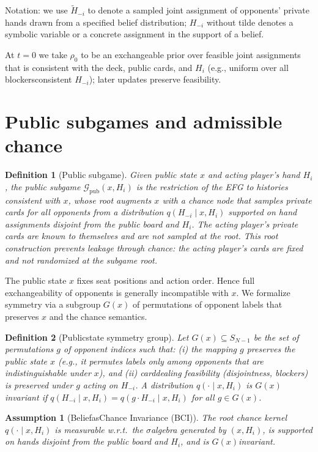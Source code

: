 \documentclass[10pt]{article}
\newcommand{\1}{\mathbf{1}}
\theoremstyle{plain}
\newtheorem{definition}{Definition}
\newtheorem{assumption}{Assumption}
\begin{document}
Notation: we use $\tilde H_{-i}$ to denote a sampled joint assignment of opponents' private hands drawn from a specified belief distribution; $H_{-i}$ without tilde denotes a symbolic variable or a concrete assignment in the support of a belief.

At $t=0$ we take $\rho_0$ to be an exchangeable prior over feasible joint assignments that is consistent with the deck, public cards, and $H_i$ (e.g., uniform over all blockers\textendash consistent $H_{-i}$); later updates preserve feasibility.

\section{Public subgames and admissible chance}
\label{sec:public_subgames}
\begin{definition}[Public subgame]
Given public state $x$ and acting player's hand $H_i$, the \emph{public subgame} $\mathcal{G}_{\text{pub}}(x,H_i)$ is the restriction of the EFG to histories consistent with $x$, whose root augments $x$ with a chance node that samples private cards for all \emph{opponents} from a distribution $q(H_{-i}\mid x,H_i)$ supported on hand assignments disjoint from the public board and $H_i$. The acting player’s private cards are known to themselves and are not sampled at the root. This root construction prevents leakage through chance: the acting player’s cards are fixed and not randomized at the subgame root.
\end{definition}

The public state $x$ fixes seat positions and action order. Hence full exchangeability of opponents is generally incompatible with $x$. We formalize symmetry via a subgroup $G(x)$ of permutations of opponent labels that preserves $x$ and the chance semantics.

\begin{definition}[Public\textendash state symmetry group]
Let $G(x)\subseteq S_{N-1}$ be the set of permutations $g$ of opponent indices such that: (i) the mapping $g$ preserves the public state $x$ (e.g., it permutes labels only among opponents that are indistinguishable under $x$), and (ii) card\textendash dealing feasibility (disjointness, blockers) is preserved under $g$ acting on $H_{-i}$. A distribution $q(\cdot\mid x,H_i)$ is \emph{$G(x)$\textendash invariant} if $q(H_{-i}\mid x,H_i)=q(g\cdot H_{-i}\mid x,H_i)$ for all $g\in G(x)$.
\end{definition}

\begin{assumption}[Belief\textendash as\textendash Chance Invariance (BCI)]
\label{ass:bci}
The root chance kernel $q(\cdot\mid x,H_i)$ is measurable w.r.t.\ the $\sigma$\textendash algebra generated by $(x,H_i)$, is supported on hands disjoint from the public board and $H_i$, and is $G(x)$\textendash invariant.
\end{assumption}
\end{document}
